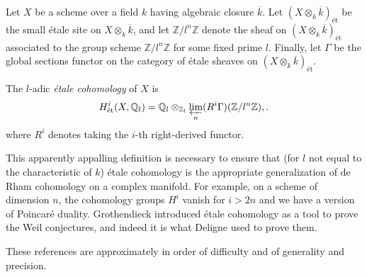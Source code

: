 \documentclass[12pt]{article}
\begin{document}
Let $X$ be a scheme over a field $k$ having algebraic closure $\overline{k}$.
Let $(X\otimes_k \overline{k})_\text{\'et}$ be the small \'etale site on $X\otimes_k \overline{k}$, 
and let $\mathbb{Z}/l^n\mathbb{Z}$ denote the sheaf on $(X\otimes_k \overline{k})_\text{\'et}$ associated to the group scheme $\mathbb{Z}/l^n\mathbb{Z}$ for some fixed prime $l$.  
Finally, let $\Gamma$ be the global sections functor on the category of \'etale sheaves on $(X\otimes_k \overline{k})_\text{\'et}$.

The $l$-adic \emph{\'etale cohomology} of $X$ is
\[
H^i_\text{\'et}(X,\mathbb{Q}_l) = \mathbb{Q}_l \otimes_{\mathbb{Z}_l} \varprojlim_n (R^i\Gamma)(\mathbb{Z}/l^n\mathbb{Z}),.
\]
where $R^i$ denotes taking the $i$-th right-derived functor.

This apparently appalling definition is necessary to ensure that (for $l$ not equal to the characteristic of $k$) \'etale cohomology is the appropriate generalization of de Rham cohomology on a complex manifold.  
For example, on a scheme of dimension $n$, the cohomology groups $H^i$ vanish for $i>2n$ and we have a version of Poincar\'e duality.
Grothendieck introduced \'etale cohomology as a tool to prove the Weil conjectures, and indeed it is what Deligne used to prove them.



These references are approximately in order of difficulty and of generality and precision.

\begin{thebibliography}{9}





\end{thebibliography}
\end{document}
